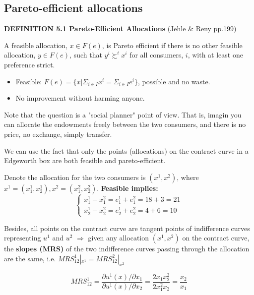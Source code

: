 \documentclass{article}
\begin{document}
\subsection{Pareto-efficient allocations}

\begin{mdframed}[backgroundcolor=blue!20,linecolor=white]
\textbf{DEFINITION 5.1 Pareto-Efficient Allocations} (Jehle \& Reny pp.199)

A feasible allocation, $x \in F(e)$, is Pareto efficient if there is no other feasible allocation, $y \in F(e)$, such that $y^i \succsim^i x^i$ for all consumers, $i$, with at least one preference strict.

\begin{itemize}
\item Feasible: $F(e) = \{x| \Sigma_{i \in I}x^i = \Sigma_{i \in I}e^i \}$, possible and no waste.
\item No improvement without harming anyone.
\end{itemize}

Note that the question is a "social planner" point of view. That is, imagin you can allocate the endowments freely between
the two consumers, and there is no price, no exchange, simply transfer.

\end{mdframed}

We can use the fact that only the points (allocations) on the contract curve in a 
Edgeworth box are both feasible and pareto-efficient.

Denote the allocation for the two consumers is $(x^1,x^2)$, where
$x^1 = (x^1_1,x^1_2),x^2 = (x^2_1,x^2_2)$. \textbf{Feasible implies:}
\begin{equation}
    \begin{cases}
x^1_1+x^2_1= e^1_1 +e^2_1 = 18+3 =21 \\
x^1_2+x^2_2= e^1_2 +e^2_2 = 4+6 =10
    \end{cases}
\label{eq:fe}
\end{equation}

Besides, all points on the contract curve are tangent points of 
indifference curves representing $u^1$ and $u^2$ $\Rightarrow$ given
any allocation $(x^1,x^2)$ on the contract curve, the \textbf{slopes (MRS)} of the two indifference curves passing through the allocation are the same, i.e. $MRS^1_{12} |_{x^1} = MRS^2_{12}|_{x^2}$

$$MRS^1_{12} = \frac{\partial u^1(x) / \partial x_1}{\partial u^1(x) / \partial x_2} = \frac{2x_1x_2^2}{2x_1^2x_2} = \frac{x_2}{x_1}$$
\end{document}
